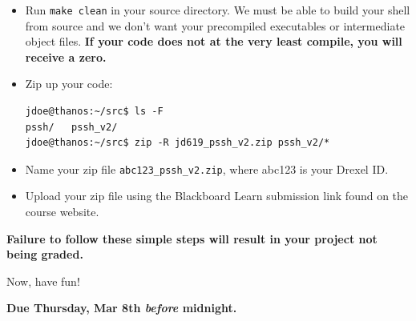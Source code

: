 \documentclass[10pt]{article}
\begin{document}
\begin{itemize}
    \item Run \texttt{make clean} in your source directory.  We must be
        able to build your shell from source and we don't want your
        precompiled executables or intermediate object files.
        \textbf{If your code does not at the very least compile, you
        will receive a zero.}

    \item Zip up your code:

\begin{verbatim}
jdoe@thanos:~/src$ ls -F
pssh/   pssh_v2/
jdoe@thanos:~/src$ zip -R jd619_pssh_v2.zip pssh_v2/*
\end{verbatim}

    \item Name your zip file \texttt{abc123\_pssh\_v2.zip}, where abc123
        is your Drexel ID.

    \item Upload your zip file using the Blackboard Learn submission
        link found on the course website.
\end{itemize}

\textbf{Failure to follow these simple steps will result in your project
not being graded.}

\begin{center}
    Now, have fun!
\end{center}


\begin{center}
\vspace{12pt}
\textbf{Due Thursday, Mar 8th \emph{before} midnight.}
\end{center}
\end{document}
